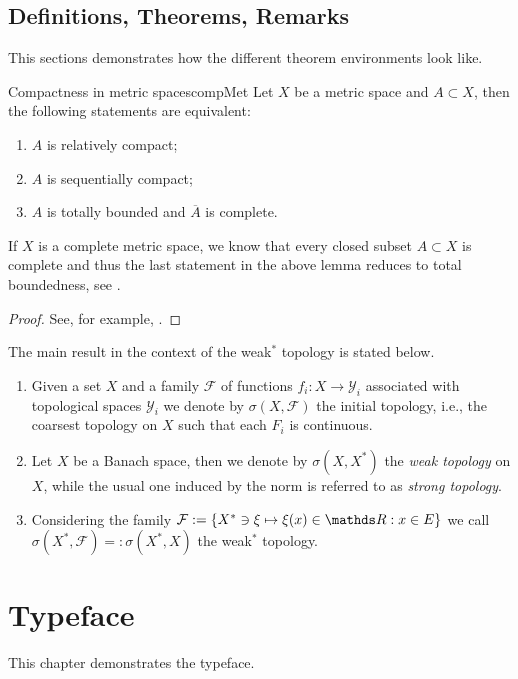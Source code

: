 \section{Definitions, Theorems, Remarks}
This sections demonstrates how the different theorem environments look like.
\begin{lemma}{Compactness in metric spaces}{compMet}
Let $X$ be a metric space and $A\subset X$, then the following statements are equivalent:
\begin{enumerate}[label=(\roman*)]
\item $A$ is relatively compact;
\item $A$ is sequentially compact;
\item $A$ is totally bounded and $\overline A$ is complete.
\end{enumerate}	
\end{lemma}
\begin{remark}{}{}
If $X$ is a complete metric space, we know that every closed subset $A\subset X$ is 
complete and thus the last statement in the above lemma reduces to total boundedness, 
see \cite[Lem. I.6.7]{Dunf60}.
\end{remark}
\begin{proof}
See, for example, \cite[Lem. I.6.15]{Dunf60}.
\end{proof}
The main result in the context of the weak$^\ast$ topology is stated below.
\begin{definition}{}{}
\begin{enumerate}[label=(\roman*)]
\item Given a set $X$ and a family $\mathcal{F}$ of functions $f_i:X\rightarrow \mathcal{Y}_i$ 
associated with topological spaces $\mathcal{Y}_i$ we denote by $\sigma(X,\mathcal{F})$ 
the initial topology, i.e., the coarsest topology on $X$ such that each $F_i$ is continuous.
\item Let $X$ be a Banach space, then we denote by $\sigma(X,X^{\ast})$ the 
\emph{weak topology} on $X$, while the usual one induced by the norm is referred to as 
\emph{strong topology}.
\item Considering the family $\mathcal{F}:=\{X^{\ast}\ni\xi\mapsto\xi(x)\in\R: x\in E\}$ 
we call $\sigma(X^{\ast}, \mathcal{F}) =:\sigma(X^{\ast},X)$ the weak$^\ast$ topology.
\end{enumerate}
\end{definition}
\chapter{Typeface}
This chapter demonstrates the typeface.
\kant
